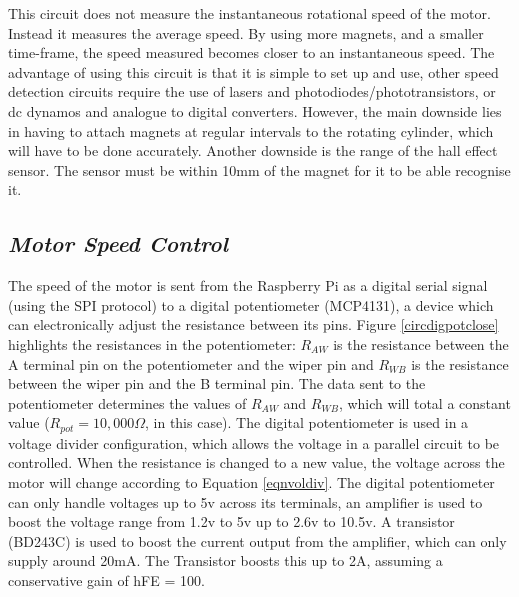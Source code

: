 \documentclass[a4]{report}
\begin{document}
	This circuit does not measure the instantaneous rotational speed of the motor. Instead it measures the average speed. By using more magnets, and a smaller time-frame, the speed measured becomes closer to an instantaneous speed. The advantage of using this circuit is that it is simple to set up and use, other speed detection circuits require the use of lasers and photodiodes/phototransistors, or dc dynamos and analogue to digital converters. However, the main downside lies in having to attach magnets at regular intervals to the rotating cylinder, which will have to be done accurately. Another downside is the range of the hall effect sensor. The sensor must be within 10mm of the magnet for it to be able recognise it. \newline \newline \noindent


	\subsection{\textit{Motor Speed Control}}
	The speed of the motor is sent from the Raspberry Pi as a digital serial signal (using the SPI protocol) to a digital potentiometer (MCP4131), a device which can electronically adjust the resistance between its pins. Figure \ref{circdigpotclose} highlights the resistances in the potentiometer: \(R_{AW}\) is the resistance between the A terminal pin on the potentiometer and the wiper pin and \(R_{WB}\) is the resistance between the wiper pin and the B terminal pin. The data sent to the potentiometer determines the values of \(R_{AW}\) and \(R_{WB}\), which will total a constant value (\(R_{pot} = 10,000\Omega \), in this case). The digital potentiometer is used in a voltage divider configuration, which allows the voltage in a parallel circuit to be controlled. When the resistance is changed to a new value, the voltage across the motor will change according to Equation \ref{eqnvoldiv}. The digital potentiometer can only handle voltages up to 5v across its terminals, an amplifier is used to boost the voltage range from 1.2v to 5v up to 2.6v to 10.5v. A transistor (BD243C) is used to boost the current output from the amplifier, which can only supply around 20mA. The Transistor boosts this up to 2A, assuming a conservative gain of hFE = 100.\newline
	
\end{document}
